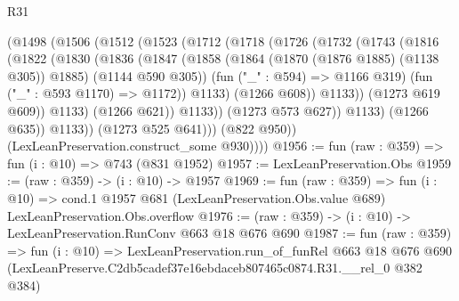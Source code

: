 \begin{lexlean}{R31}
\begin{coremodule}
                  (@1498
                    (@1506
                      (@1512
                        (@1523
                          (@1712
                            (@1718
                              (@1726
                                (@1732
                                  (@1743
                                    (@1816
                                      (@1822
                                        (@1830
                                          (@1836
                                            (@1847
                                              (@1858
                                                (@1864 (@1870 (@1876 @1885) (@1138 @305)) @1885)
                                                (@1144 @590 @305))
                                              (fun ("_" : @594) => @1166 @319)
                                              (fun ("_" : @593 @1170) => @1172))
                                            @1133)
                                          (@1266 @608))
                                        @1133))
                                    (@1273 @619 @609))
                                  @1133)
                                (@1266 @621))
                              @1133))
                          (@1273 @573 @627))
                        @1133)
                      (@1266 @635))
                    @1133))
                (@1273 @525 @641)))
            (@822 @950))
          (LexLeanPreservation.construct_some @930))))
@1956 := fun (raw : @359) => fun (i : @10) => @743 (@831 @1952)
@1957 := LexLeanPreservation.Obs
@1959 := (raw : @359) -> (i : @10) -> @1957
@1969 := fun (raw : @359) =>
  fun (i : @10) =>
  cond.{1} @1957 @681 (LexLeanPreservation.Obs.value @689) LexLeanPreservation.Obs.overflow
@1976 := (raw : @359) -> (i : @10) -> LexLeanPreservation.RunConv @663 @18 @676 @690
@1987 := fun (raw : @359) =>
  fun (i : @10) =>
  LexLeanPreservation.run_of_funRel
    @663
    @18
    @676
    @690
    (LexLeanPreserve.C2db5cadef37e16ebdaceb807465c0874.R31.__rel_0 @382 @384)
\end{coremodule}
\end{lexlean}
